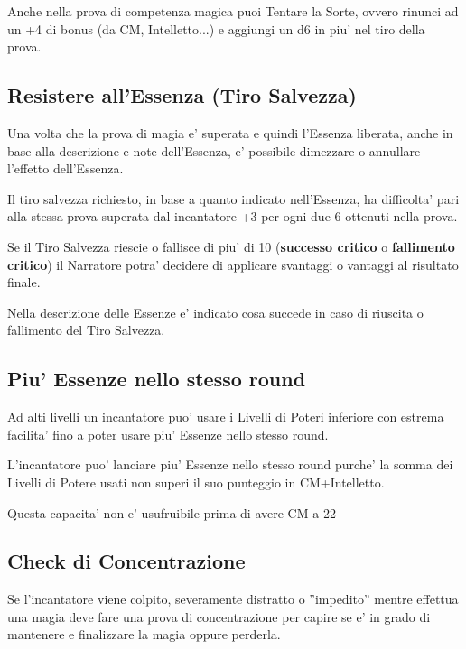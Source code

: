 \documentclass[a4paper,11pt,twoside,openany]{book}
\begin{document}
Anche nella prova di competenza magica puoi Tentare la Sorte, ovvero rinunci ad un +4 di bonus (da CM, Intelletto...) e aggiungi un d6 in piu' nel tiro della prova.

\subsection{Resistere all'Essenza (Tiro Salvezza)}

\label{resistere-allessenza-tiro-salvezza}

Una volta che la prova di magia e' superata e quindi l'Essenza liberata, anche in base alla descrizione e note dell'Essenza, e' possibile dimezzare o annullare l'effetto dell'Essenza.

Il tiro salvezza richiesto, in base a quanto indicato nell'Essenza, ha difficolta' pari alla stessa prova superata dal incantatore +3 per ogni due 6 ottenuti nella prova.

Se il Tiro Salvezza riescie o fallisce di piu' di 10 (\textbf{successo critico} o \textbf{fallimento critico}) il Narratore potra' decidere di applicare svantaggi o vantaggi al risultato finale.

Nella descrizione delle Essenze e' indicato cosa succede in caso di riuscita o fallimento del Tiro Salvezza.

\subsection{Piu' Essenze nello stesso round}

Ad alti livelli un incantatore puo' usare i Livelli di Poteri inferiore con estrema facilita' fino a poter usare piu' Essenze nello stesso round.

L'incantatore puo' lanciare piu' Essenze nello stesso round purche' la somma dei Livelli di Potere usati non superi il suo punteggio in CM+Intelletto.

Questa capacita' non e' usufruibile prima di avere CM a 22

\subsection{Check di Concentrazione}

Se l'incantatore viene colpito, severamente distratto o ''impedito'' mentre effettua una magia deve fare una prova di concentrazione per capire se e' in grado di mantenere e finalizzare la magia oppure perderla.
\end{document}

